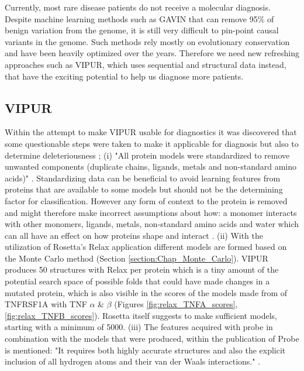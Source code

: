 Currently, most rare disease patients do not receive a molecular diagnosis.
Despite machine learning methods such as GAVIN that can remove 95\% of benign variation from the genome\cite{van_der_velde_gavin:_2017}, it is still very difficult to pin-point causal variants in the genome.
Such methods rely mostly on evolutionary conservation and have been heavily optimized over the years.
Therefore we need new refreshing approaches such as VIPUR, which uses sequential and structural data instead, that have the exciting potential to help us diagnose more patients. 

\subsection{VIPUR}
Within the attempt to make VIPUR usable for diagnostics it was discovered that some questionable steps were taken to make it applicable for diagnosis but also to determine deleteriousness ; (i) "All protein models were standardized to remove unwanted components (duplicate chains, ligands, metals and non-standard amino acids)" \cite{baugh_robust_2016}.
Standardizing data can be beneficial to avoid learning features from proteins that are available to some models but should not be the determining factor for classification. However any form of context to the protein is removed and might therefore make incorrect assumptions about how: a monomer interacts with other monomers, ligands, metals, non-standard amino acids and water which can all have an effect on how proteins shape and interact \cite{koshland_application_1958}.
(ii) With the utilization of Rosetta's Relax application different models are formed based on the Monte Carlo method (Section \ref{section:Chap_Monte_Carlo}). VIPUR produces 50 structures with Relax per protein which is a tiny amount of the potential search space of possible folds that could have made changes in a mutated protein, which is also visible in the scores of the models made from of TNFRSF1A with TNF $\alpha$ \& $\beta$ (Figures \ref{fig:relax_TNFA_scores}, \ref{fig:relax_TNFB_scores}). Rosetta itself suggests to make sufficient models, starting with a minimum of 5000\cite{rosetta_commons_analyzing_nodate}.
(iii) The features acquired with probe in combination with the models that were produced, within the publication of Probe is mentioned: "It requires both highly accurate structures and also the explicit inclusion of all hydrogen atoms and their van der Waals interactions." \cite{word_visualizing_1999}.

